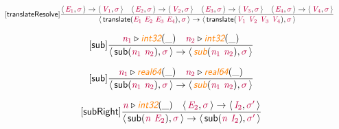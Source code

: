 \documentclass[10pt,leqno,fleqn]{article}
\newcommand{\artVariable}[1]{\mbox{\color{purple}\em #1\/}}
\newcommand{\artConstructor}[1]{\mbox{\sf #1}}
\newcommand{\artSpecial}[1]{\mbox{\color{orange}\sf\em #1}}
\begin{document}
\begin{equation}
\tag*{[\artConstructor{\sf translateResolve}]}
\begin{split}\frac{\langle\, \artVariable{E$_{1}$}, \artVariable{$\sigma$}\,\rangle \rightarrow \langle\, \artVariable{V$_{1}$}, \artVariable{$\sigma$}\,\rangle \quad \langle\, \artVariable{E$_{2}$}, \artVariable{$\sigma$}\,\rangle \rightarrow \langle\, \artVariable{V$_{2}$}, \artVariable{$\sigma$}\,\rangle \quad \langle\, \artVariable{E$_{3}$}, \artVariable{$\sigma$}\,\rangle \rightarrow \langle\, \artVariable{V$_{3}$}, \artVariable{$\sigma$}\,\rangle \quad \langle\, \artVariable{E$_{4}$}, \artVariable{$\sigma$}\,\rangle \rightarrow \langle\, \artVariable{V$_{4}$}, \artVariable{$\sigma$}\,\rangle }{\langle\, \artConstructor{\sf translate}(\artVariable{E$_{1}$}\ \artVariable{E$_{2}$}\ \artVariable{E$_{3}$}\ \artVariable{E$_{4}$}), \artVariable{$\sigma$}\,\rangle \rightarrow \langle\, \artConstructor{\sf translate}(\artVariable{V$_{1}$}\ \artVariable{V$_{2}$}\ \artVariable{V$_{3}$}\ \artVariable{V$_{4}$}), \artVariable{$\sigma$}\,\rangle }
\end{split}
\end{equation}

\begin{equation}
\tag*{[\artConstructor{\sf sub}]}
\begin{split}\frac{ \artVariable{n$_{1}$}\triangleright \artSpecial{int32}(\_) \quad  \artVariable{n$_{2}$}\triangleright \artSpecial{int32}(\_) }{\langle\, \artConstructor{\sf sub}(\artVariable{n$_{1}$}\ \artVariable{n$_{2}$}), \artVariable{$\sigma$}\,\rangle \rightarrow \langle\, \artSpecial{sub}(\artVariable{n$_{1}$}\ \artVariable{n$_{2}$}), \artVariable{$\sigma$}\,\rangle }
\end{split}
\end{equation}

\begin{equation}
\tag*{[\artConstructor{\sf sub}]}
\begin{split}\frac{ \artVariable{n$_{1}$}\triangleright \artSpecial{real64}(\_) \quad  \artVariable{n$_{2}$}\triangleright \artSpecial{real64}(\_) }{\langle\, \artConstructor{\sf sub}(\artVariable{n$_{1}$}\ \artVariable{n$_{2}$}), \artVariable{$\sigma$}\,\rangle \rightarrow \langle\, \artSpecial{sub}(\artVariable{n$_{1}$}\ \artVariable{n$_{2}$}), \artVariable{$\sigma$}\,\rangle }
\end{split}
\end{equation}

\begin{equation}
\tag*{[\artConstructor{\sf subRight}]}
\begin{split}\frac{ \artVariable{n}\triangleright \artSpecial{int32}(\_) \quad \langle\, \artVariable{E$_{2}$}, \artVariable{$\sigma$}\,\rangle \rightarrow \langle\, \artVariable{I$_{2}$}, \artVariable{$\sigma$\/$^\prime$}\,\rangle }{\langle\, \artConstructor{\sf sub}(\artVariable{n}\ \artVariable{E$_{2}$}), \artVariable{$\sigma$}\,\rangle \rightarrow \langle\, \artConstructor{\sf sub}(\artVariable{n}\ \artVariable{I$_{2}$}), \artVariable{$\sigma$\/$^\prime$}\,\rangle }
\end{split}
\end{equation}
\end{document}

